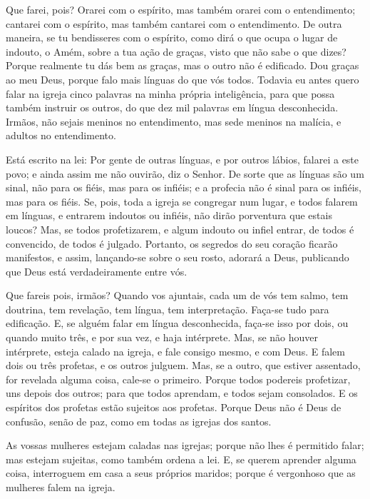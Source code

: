 Que farei, pois? Orarei com o espírito, mas também orarei com o
entendimento; cantarei com o espírito, mas também cantarei com o
entendimento. De outra maneira, se tu bendisseres com o
espírito, como dirá o que ocupa o lugar de indouto, o Amém, sobre a
tua ação de graças, visto que não sabe o que dizes? Porque
realmente tu dás bem as graças, mas o outro não é edificado.
Dou graças ao meu Deus, porque falo mais línguas do que vós
todos. Todavia eu antes quero falar na igreja cinco palavras
na minha própria inteligência, para que possa também instruir os
outros, do que dez mil palavras em língua desconhecida.
Irmãos, não sejais meninos no entendimento, mas sede meninos
na malícia, e adultos no entendimento.

Está escrito na lei: Por gente de outras línguas, e por outros
lábios, falarei a este povo; e ainda assim me não ouvirão, diz o
Senhor. De sorte que as línguas são um sinal, não para os
fiéis, mas para os infiéis; e a profecia não é sinal para os
infiéis, mas para os fiéis. Se, pois, toda a igreja se
congregar num lugar, e todos falarem em línguas, e entrarem indoutos
ou infiéis, não dirão porventura que estais loucos? Mas, se
todos profetizarem, e algum indouto ou infiel entrar, de todos é
convencido, de todos é julgado. Portanto, os segredos do seu
coração ficarão manifestos, e assim, lançando-se sobre o seu rosto,
adorará a Deus, publicando que Deus está verdadeiramente entre vós.

Que fareis pois, irmãos? Quando vos ajuntais, cada um de vós tem
salmo, tem doutrina, tem revelação, tem língua, tem interpretação.
Faça-se tudo para edificação. E, se alguém falar em língua
desconhecida, faça-se isso por dois, ou quando muito três, e por sua
vez, e haja intérprete. Mas, se não houver intérprete, esteja
calado na igreja, e fale consigo mesmo, e com Deus. E falem
dois ou três profetas, e os outros julguem. Mas, se a outro,
que estiver assentado, for revelada alguma coisa, cale-se o
primeiro. Porque todos podereis profetizar, uns depois dos
outros; para que todos aprendam, e todos sejam consolados. E
os espíritos dos profetas estão sujeitos aos profetas. Porque
Deus não é Deus de confusão, senão de paz, como em todas as igrejas
dos santos.

As vossas mulheres estejam caladas nas igrejas; porque não lhes é
permitido falar; mas estejam sujeitas, como também ordena a lei.
E, se querem aprender alguma coisa, interroguem em casa a
seus próprios maridos; porque é vergonhoso que as mulheres falem na
igreja.

